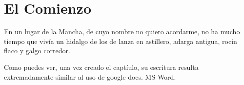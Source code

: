 \chapter{El Comienzo}
En un lugar de la Mancha, de cuyo nombre no quiero acordarme, no ha mucho tiempo que vivía un hidalgo de los de lanza en astillero, adarga antigua, rocín flaco y galgo corredor.

Como puedes ver, una vez creado el captíulo, su escritura resulta extremadamente similar al uso de google docs. MS Word.
